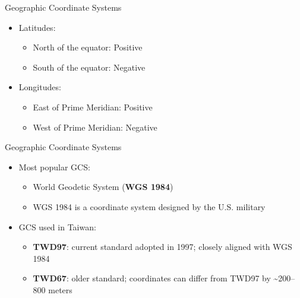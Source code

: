 \documentclass[hyperref={pdfpagelabels=false}]{beamer}
\begin{document}
\begin{frame}{Geographic Coordinate Systems}
	\begin{itemize}
		
		\item Latitudes:
		\vspace{0.2cm}
		\begin{itemize}
			\item North of the equator: Positive
			\vspace{0.2cm}
			\item South of the equator: Negative
		\end{itemize}
		\vspace{0.2cm}
		\item Longitudes:
		\vspace{0.2cm}
		\begin{itemize}
			\item East of Prime Meridian: Positive
			\vspace{0.2cm}
			\item West of Prime Meridian: Negative
		\end{itemize}
		
	\end{itemize}
\end{frame}
 
 
 
 
\begin{frame}{Geographic Coordinate Systems}
	\begin{itemize}
		
		\item Most popular GCS: 
		\begin{itemize}
			\vspace{0.2cm}
			\item World Geodetic System (\textbf{WGS 1984})
			\vspace{0.2cm}
			\item WGS 1984 is a coordinate system designed by the U.S. military
		\end{itemize}
		\vspace{0.2cm}
		\item GCS used in Taiwan:
		\vspace{0.2cm}
		\begin{itemize}
			\item \textbf{TWD97}: current standard adopted in 1997; closely aligned with WGS 1984 
			\vspace{0.2cm}
			\item \textbf{TWD67}: older standard; coordinates can differ from TWD97 by \textasciitilde{}200--800 meters 
		\end{itemize}
		
	\end{itemize}
\end{frame}
 
\end{document}
